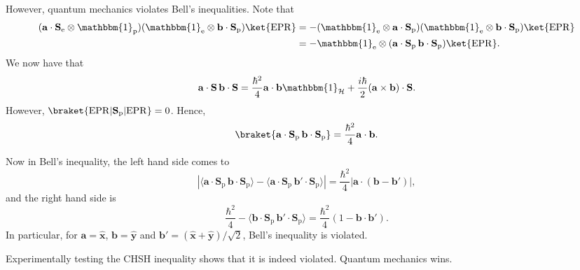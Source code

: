 \documentclass[12pt]{article}
\begin{document}
However, quantum mechanics violates Bell's inequalities. Note that
\begin{align*}
	(\mathbf{a} \cdot \mathbf{S}_{\mathrm{e}} \otimes \mathbbm{1}_{\mathrm{p}})(\mathbbm{1}_{\mathrm{e}} \otimes \mathbf{b} \cdot \mathbf{S}_{\mathrm{p}})\ket{\mathrm{EPR}} &= -(\mathbbm{1}_{\mathrm{e}} \otimes \mathbf{a} \cdot \mathbf{S}_{\mathrm{p}})(\mathbbm{1}_{\mathrm{e}} \otimes \mathbf{b} \cdot \mathbf{S}_{\mathrm{p}}) \ket{\mathrm{EPR}} \\
																						 &= - \mathbbm{1}_{\mathrm{e}} \otimes(\mathbf{a} \cdot \mathbf{S}_{\mathrm{p}} \, \mathbf{b} \cdot \mathbf{S}_{\mathrm{p}}) \ket{\mathrm{EPR}}.
\end{align*}
We now have that
\[
\mathbf{a} \cdot \mathbf{S} \, \mathbf{b} \cdot \mathbf{S} = \frac{\hbar^2}{4} \mathbf{a} \cdot \mathbf{b} \mathbbm{1}_{\mathcal{H}} + \frac{i \hbar}{2} (\mathbf{a} \times \mathbf{b}) \cdot \mathbf{S}.
\]
However, $\braket{\mathrm{EPR}|\mathbf{S}_{\mathrm{p}}|\mathrm{EPR}} = 0$. Hence,
\[
	\braket{\mathbf{a} \cdot \mathbf{S}_{\mathrm{p}} \, \mathbf{b} \cdot \mathbf{S}_{\mathrm{p}}} = \frac{\hbar^2}{4} \mathbf{a} \cdot \mathbf{b}.
\]

Now in Bell's inequality, the left hand side comes to
\[
|\langle\mathbf{a} \cdot \mathbf{S}_{\mathrm{p}} \, \mathbf{b} \cdot \mathbf{S}_{\mathrm{p}} \rangle - \langle \mathbf{a} \cdot \mathbf{S}_{\mathrm{p}} \, \mathbf{b}' \cdot \mathbf{S}_{\mathrm{p}}\rangle| = \frac{\hbar^2}{4}|\mathbf{a} \cdot (\mathbf{b} - \mathbf{b}')|,
\]
and the right hand side is
\[
\frac{\hbar^2}{4} - \langle\mathbf{b} \cdot \mathbf{S}_{\mathrm{p}} \, \mathbf{b}' \cdot \mathbf{S}_{\mathrm{p}} \rangle = \frac{\hbar^2}{4}(1 - \mathbf{b} \cdot \mathbf{b}').
\]
In particular, for $\mathbf{a} = \mathbf{\hat x}$, $\mathbf{b} = \mathbf{\hat y}$ and $\mathbf{b'} = (\mathbf{\hat x} + \mathbf{\hat y})/\sqrt 2$, Bell's inequality is violated.

Experimentally testing the CHSH inequality shows that it is indeed violated. Quantum mechanics wins.




\newpage

\printindex
\end{document}
